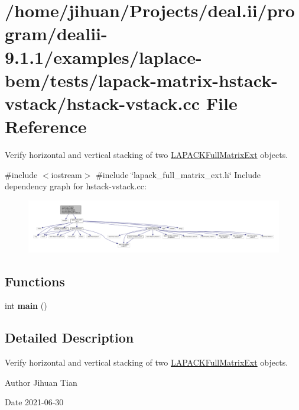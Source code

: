 \hypertarget{hstack-vstack_8cc}{}\section{/home/jihuan/\+Projects/deal.ii/program/dealii-\/9.1.1/examples/laplace-\/bem/tests/lapack-\/matrix-\/hstack-\/vstack/hstack-\/vstack.cc File Reference}
\label{hstack-vstack_8cc}


Verify horizontal and vertical stacking of two \hyperlink{classLAPACKFullMatrixExt}{L\+A\+P\+A\+C\+K\+Full\+Matrix\+Ext} objects.  


{\ttfamily \#include $<$iostream$>$}\newline
{\ttfamily \#include \char`\"{}lapack\+\_\+full\+\_\+matrix\+\_\+ext.\+h\char`\"{}}\newline
Include dependency graph for hstack-\/vstack.cc\+:
\nopagebreak
\begin{figure}[H]
\begin{center}
\leavevmode
\includegraphics[width=350pt]{hstack-vstack_8cc__incl}
\end{center}
\end{figure}
\subsection*{Functions}
\begin{DoxyCompactItemize}
\item 
\mbox{\label{hstack-vstack_8cc_ae66f6b31b5ad750f1fe042a706a4e3d4}} 
int {\bfseries main} ()
\end{DoxyCompactItemize}


\subsection{Detailed Description}
Verify horizontal and vertical stacking of two \hyperlink{classLAPACKFullMatrixExt}{L\+A\+P\+A\+C\+K\+Full\+Matrix\+Ext} objects. 

\begin{DoxyAuthor}{Author}
Jihuan Tian 
\end{DoxyAuthor}
\begin{DoxyDate}{Date}
2021-\/06-\/30 
\end{DoxyDate}
